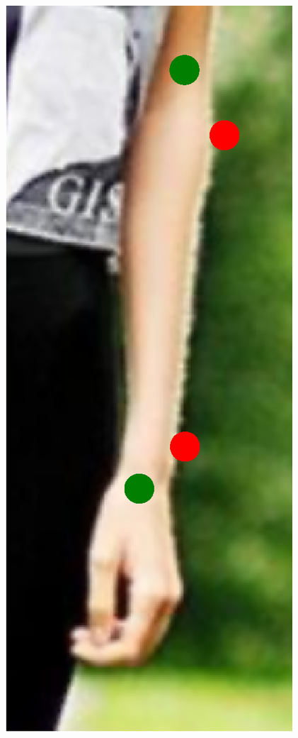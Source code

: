 \begin{figure}[!t]
    \includegraphics[height=\fh]{resources/Fixing/fix_5}
    \hfill

\end{figure}
